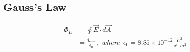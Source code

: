 \documentclass[a4paper]{article}
\begin{document}
\begin{center}
  \section*{Gauss's Law}
\end{center}
\begin{equation}
  \begin{split}
  \Phi_E &= \oint \overrightarrow{E} \cdot d\overrightarrow{A} \\
         &= \frac{q_{encl}}{\epsilon_0},~~where~~\epsilon_0 = 8.85\times 10^{-12}\frac{C^2}{N\cdot m^2}
  \end{split}
\end{equation}
\end{document}
